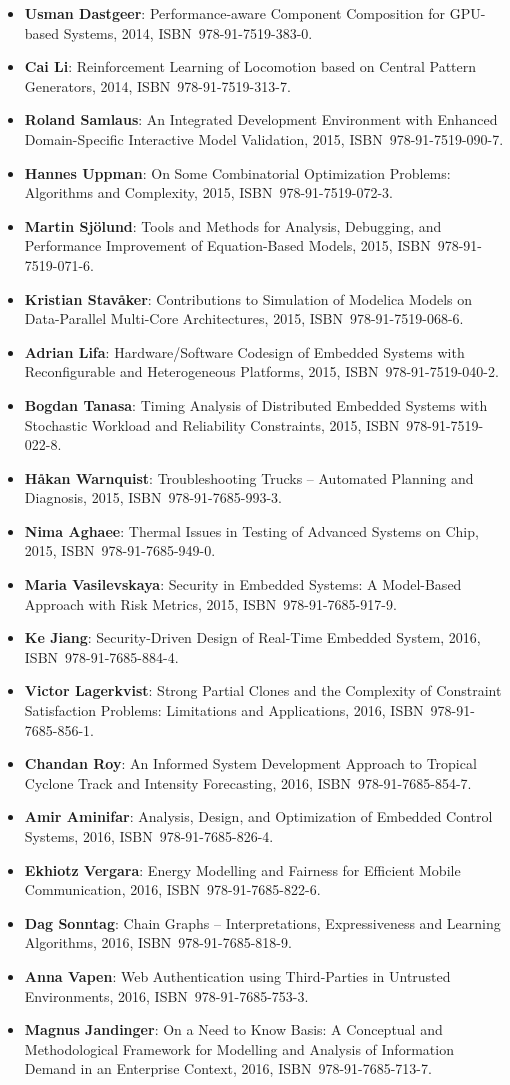 \documentclass[a4paper,showtrims,twocolumn]{memoir}
\newenvironment{theses}{
  \begin{itemize}
    \setlength{\itemsep}{0.2em}
    \setlength{\parskip}{0em}
    \setlength{\parsep}{0em}
}{
  \end{itemize}
}
\newcommand{\thesis}[5]{\item[No.~#1] \textbf{#2}: #3, #4, ISBN~#5.}
\begin{document}
\begin{theses}
    \thesis{1581}{Usman Dastgeer}{Performance-aware Component Composition for GPU-based Systems}{2014}{978-91-7519-383-0}
    \thesis{1602}{Cai Li}{Reinforcement Learning of Locomotion based on Central Pattern Generators}{2014}{978-91-7519-313-7}
    \thesis{1652}{Roland Samlaus}{An Integrated Development Environment with Enhanced Domain-Specific Interactive Model Validation}{2015}{978-91-7519-090-7}
    \thesis{1663}{Hannes Uppman}{On Some Combinatorial Optimization Problems: Algorithms and Complexity}{2015}{978-91-7519-072-3}
    \thesis{1664}{Martin Sjölund}{Tools and Methods for Analysis, Debugging, and Performance Improvement of Equation-Based Models}{2015}{978-91-7519-071-6}
    \thesis{1666}{Kristian Stavåker}{Contributions to Simulation of Modelica Models on Data-Parallel Multi-Core Architectures}{2015}{978-91-7519-068-6}
    \thesis{1680}{Adrian Lifa}{Hardware/Software Codesign of Embedded Systems with Reconfigurable and Heterogeneous Platforms}{2015}{978-91-7519-040-2}
    \thesis{1685}{Bogdan Tanasa}{Timing Analysis of Distributed Embedded Systems with Stochastic Workload and Reliability Constraints}{2015}{978-91-7519-022-8}
    \thesis{1691}{Håkan Warnquist}{Troubleshooting Trucks – Automated Planning and Diagnosis}{2015}{978-91-7685-993-3}
    \thesis{1702}{Nima Aghaee}{Thermal Issues in Testing of Advanced Systems on Chip}{2015}{978-91-7685-949-0}
    \thesis{1715}{Maria Vasilevskaya}{Security in Embedded Systems: A Model-Based Approach with Risk Metrics}{2015}{978-91-7685-917-9}
    \thesis{1729}{Ke Jiang}{Security-Driven Design of Real-Time Embedded System}{2016}{978-91-7685-884-4}
    \thesis{1733}{Victor Lagerkvist}{Strong Partial Clones and the Complexity of Constraint Satisfaction Problems: Limitations and Applications}{2016}{978-91-7685-856-1}
    \thesis{1734}{Chandan Roy}{An Informed System Development Approach to Tropical Cyclone Track and Intensity Forecasting}{2016}{978-91-7685-854-7}
    \thesis{1746}{Amir Aminifar}{Analysis, Design, and Optimization of Embedded Control Systems}{2016}{978-91-7685-826-4}
    \thesis{1747}{Ekhiotz Vergara}{Energy Modelling and Fairness for Efficient Mobile Communication}{2016}{978-91-7685-822-6}
    \thesis{1748}{Dag Sonntag}{Chain Graphs – Interpretations, Expressiveness and Learning Algorithms}{2016}{978-91-7685-818-9}
    \thesis{1768}{Anna Vapen}{Web Authentication using Third-Parties in Untrusted Environments}{2016}{978-91-7685-753-3}
    \thesis{1778}{Magnus Jandinger}{On a Need to Know Basis: A Conceptual and Methodological Framework for Modelling and Analysis of Information Demand in an Enterprise Context}{2016}{978-91-7685-713-7}

\end{theses}
\end{document}
